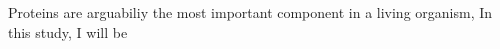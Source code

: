 Proteins are arguabiliy the most important component in a living organism,  In this study, I will be 